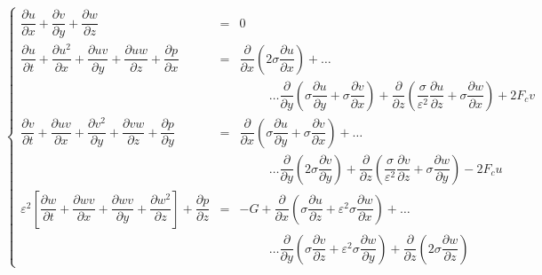 \documentclass[10pt,a4paper]{amsart}
\begin{document}
\begin{equation}\label{NSEI_SD_cartesien}
\left\{
\begin{array}{rcl}

\dfrac{\partial u}{\partial x} + \dfrac{\partial v}{\partial y}+\dfrac{\partial w}{\partial z} & = & 0 \\


\dfrac{\partial u}{\partial t} +  \dfrac{\partial u^2}{\partial x} + \dfrac{\partial u v}{\partial y} + \dfrac{\partial u w}{\partial z} + \dfrac{\partial p}{\partial x} & = & \dfrac{\partial}{\partial x}\left( 2 \sigma \dfrac{\partial u}{\partial x} \right) +  \ldots\\

 &  &  \hspace{1cm} \ldots \dfrac{\partial}{\partial y}\left(\sigma \dfrac{\partial u}{\partial y} + \sigma \dfrac{\partial v}{\partial x}\right) + \dfrac{\partial}{\partial z}\left(\dfrac{\sigma}{\varepsilon^2} \dfrac{\partial u}{\partial z} + \sigma \dfrac{\partial w}{\partial x}\right) + 2 F_c v
\\


\dfrac{\partial v}{\partial t} +  \dfrac{\partial uv}{\partial x} + \dfrac{\partial v^2}{\partial y} + \dfrac{\partial v w}{\partial z} + \dfrac{\partial p}{\partial y} & = &  \dfrac{\partial}{\partial x}\left(\sigma \dfrac{\partial u}{\partial y} + \sigma \dfrac{\partial v}{\partial x}\right) + \ldots\\

 &  & \hspace{1cm} \ldots \dfrac{\partial}{\partial y}\left( 2 \sigma \dfrac{\partial v}{\partial y} \right) +  \dfrac{\partial}{\partial z}\left(\dfrac{\sigma}{\varepsilon^2} \dfrac{\partial v}{\partial z} + \sigma \dfrac{\partial w}{\partial y}\right) - 2 F_c u\\


 \varepsilon^2 \left[ \dfrac{\partial w}{\partial t} +  \dfrac{\partial wv}{\partial x} + \dfrac{\partial wv}{\partial y} + \dfrac{\partial w^2}{\partial z} \right] + \dfrac{\partial p}{\partial z} & = & -G + \dfrac{\partial}{\partial x}\left(\sigma \dfrac{\partial u}{\partial z} + \varepsilon^2 \sigma \dfrac{\partial w}{\partial x}\right) + \ldots \\
 
  &  & \hspace{1cm} \ldots \dfrac{\partial}{\partial y}\left(\sigma \dfrac{\partial v}{\partial z} + \varepsilon^2 \sigma \dfrac{\partial w}{\partial y}\right) +  \dfrac{\partial}{\partial z}\left( 2 \sigma \dfrac{\partial w}{\partial z} \right)

\end{array}
\right.
\end{equation}
\end{document}
